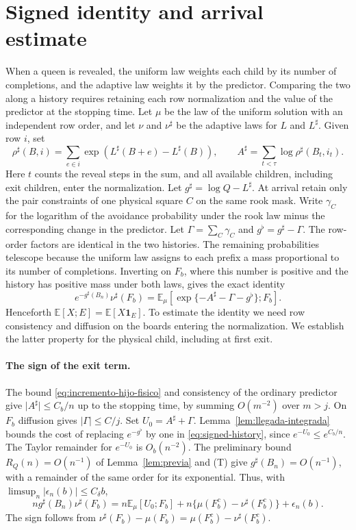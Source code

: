 \section{Signed identity and arrival estimate}\label{app:signed}
When a queen is revealed, the uniform law weights each child by its number of completions, and the
adaptive law weights it by the predictor. Comparing the two along a history requires retaining each row
normalization and the value of the predictor at the stopping time. Let \(\mu\) be the law of the uniform
solution with an independent row order, and let \(\nu\) and \(\nu^\sharp\) be the adaptive laws for \(L\)
and \(L^\sharp\). Given row \(i\), set
\[
 \rho^\sharp(B,i)=\sum_{e\in i}\exp(L^\sharp(B+e)-L^\sharp(B)),\qquad
 A^\sharp=\sum_{t<\tau}\log\rho^\sharp(B_t,i_t).
\]
Here \(t\) counts the reveal steps in the sum, and all available children, including exit children, enter
the normalization. Let \(g^\sharp=\log Q-L^\sharp\). At arrival retain only the pair constraints of one
physical square \(C\) on the same rook mask. Write \(\gamma_C\) for the logarithm of the avoidance
probability under the rook law minus the corresponding change in the predictor. Let
\(\Gamma=\sum_C\gamma_C\) and \(g^\flat=g^\sharp-\Gamma\). The row-order factors are identical in the two
histories. The remaining probabilities telescope because the uniform law assigns to each prefix a mass
proportional to its number of completions. Inverting on \(F_b\), where this number is positive and the
history has positive mass under both laws, gives the exact identity
\begin{equation}\label{eq:signed-history}
 e^{-g^\sharp(B_n)}\nu^\sharp(F_b)
 =\mathbb E_\mu[\exp\{-A^\sharp-\Gamma-g^\flat\};F_b].
\end{equation}
Henceforth \(\mathbb E[X;E]=\mathbb E[X\mathbf1_E]\). To estimate the identity we need row consistency
and diffusion on the boards entering the normalization. We establish the latter property for the
physical child, including at first exit.


\paragraph{The sign of the exit term.}
The bound \eqref{eq:incremento-hijo-fisico} and consistency of the ordinary predictor give \(\lvert
A^\sharp\rvert\le C_b/n\) up to the stopping time, by summing \(O(m^{-2})\) over \(m>j\). On \(F_b\)
diffusion gives \(|\Gamma|\le C/j\). Set \(U_0=A^\sharp+\Gamma\). Lemma~\ref{lem:llegada-integrada}
bounds the cost of replacing \(e^{-g^\flat}\) by one in \eqref{eq:signed-history}, since \(e^{-U_0}\le
e^{C_b/n}\). The Taylor remainder for \(e^{-U_0}\) is \(O_b(n^{-2})\). The preliminary bound
\(R_Q(n)=O(n^{-1})\) of Lemma~\ref{lem:previa} and (T) give \(g^\sharp(B_n)=O(n^{-1})\), with a remainder
of the same order for its exponential. Thus, with \(\limsup_n|\epsilon_n(b)|\le C_\delta b\),
\[
 n g^\sharp(B_n)\nu^\sharp(F_b)
 =n\mathbb E_\mu[U_0;F_b]+n\{\mu(F_b^c)-\nu^\sharp(F_b^c)\}+\epsilon_n(b).
\]
The sign follows from \(\nu^\sharp(F_b)-\mu(F_b)=\mu(F_b^c)-\nu^\sharp(F_b^c)\).

